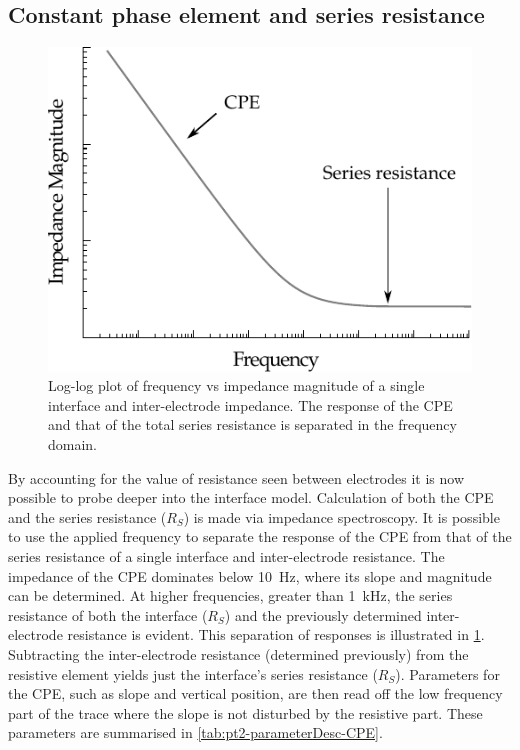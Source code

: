   \subsection{Constant phase element and series resistance}
    \begin{figure}[h]
      \centering
      \includegraphics{content/pt2/07-InterfaceModel/graphics/graph_cpePlotGeneral}
      \caption{\label{fig:pt2-graph_cpePlotGeneral}Log-log plot of frequency vs impedance magnitude of a single interface and inter-electrode impedance. The response of the CPE and that of the total series resistance is separated in the frequency domain.}
    \end{figure}
    By accounting for the value of resistance seen between electrodes it is now possible to probe deeper into the interface model.
    Calculation of both the CPE and the series resistance ($R_S$) is made via impedance spectroscopy.
    It is possible to use the applied frequency to separate the response of the CPE from that of the series resistance of a single interface and inter-electrode resistance.
    The impedance of the CPE dominates below \SI{10}{\hertz}, where its slope and magnitude can be determined.
    At higher frequencies, greater than \SI{1}{\kilo\hertz}, the series resistance of both the interface ($R_S$) and the previously determined inter-electrode resistance is evident.
    This separation of responses is illustrated in \cref{fig:pt2-graph_cpePlotGeneral}.
    Subtracting the inter-electrode resistance (determined previously) from the resistive element yields just the interface's series resistance ($R_S$).
    Parameters for the CPE, such as slope and vertical position, are then read off the low frequency part of the trace where the slope is not disturbed by the resistive part.
    These parameters are summarised in \cref{tab:pt2-parameterDesc-CPE}.

